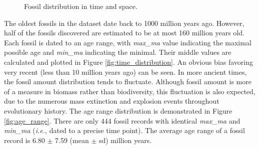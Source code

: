 \documentclass[11pt, a4paper,oneside,chapterprefix=false]{scrbook}
\begin{document}
\begin{figure}[h]
	\centering
	\hfill
	\caption{Fossil distribution in time and space.}
	\label{fig:distribution}
\end{figure}

\newpage
The oldest fossils in the dataset date back to 1000 million years ago. However, half of the fossils discovered are estimated to be at most 160 million years old. Each fossil is dated to an age range, with \emph{max\_ma} value indicating the maximal possible age and \emph{min\_ma} indicating the minimal. Their middle values are calculated and plotted in Figure \ref{fig:time_distribution}. An obvious bias favoring very recent (less than 10 million years ago) can be seen. In more ancient times, the fossil amount distribution tends to fluctuate. Although fossil amount is more of a measure in biomass rather than biodiversity, this fluctuation is also expected, due to the numerous mass extinction and explosion events throughout evolutionary history. The age range distribution is demonstrated in Figure \ref{fig:age_range}. There are only 444 fossil records with identical \emph{max\_ma} and \emph{min\_ma} (\emph{i.e.}, dated to a precise time point). The average age range of a fossil record is 6.80 $\pm$ 7.59 (mean $\pm$  sd) million years.
\end{document}
